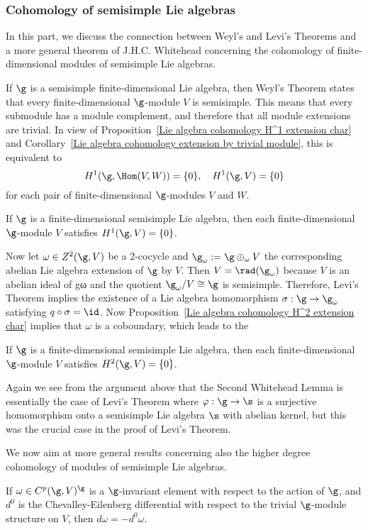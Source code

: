 \subsubsection{Cohomology of semisimple Lie algebras}
In this part, we discuss the connection between Weyl's and Levi's Theorems and a more general theorem of J.H.C. Whitehead concerning the cohomology of finite-dimensional modules of semisimple Lie algebras.\par
If $\g$ is a semisimple finite-dimensional Lie algebra, then Weyl's Theorem states that every finite-dimensional $\g$-module $V$ is semisimple. This means that every submodule has a module complement, and therefore that all module extensions are trivial. In view of Proposition~\ref{Lie algebra cohomology H^1 extension char} and Corollary~\ref{Lie algebra cohomology extension by trivial module}, this is equivalent to
\[H^1(\g,\Hom(V,W))=\{0\},\quad H^1(\g,V)=\{0\}\]
for each pair of finite-dimensional $\g$-modules $V$ and $W$.
\begin{lemma}
If $\g$ is a finite-dimensional semisimple Lie algebra, then each finite-dimensional $\g$-module $V$ satisfies $H^1(\g,V)=\{0\}$.
\end{lemma}
Now let $\omega\in Z^2(\g,V)$ be a $2$-cocycle and $\g_\omega:=\g\oplus_\omega V$ the corresponding abelian Lie algebra extension of $\g$ by $V$. Then $V=\rad(\g_\omega)$ because $V$ is an abelian ideal of gω and the quotient $\g_\omega/V\cong\g$ is semisimple. Therefore, Levi's Theorem implies the existence of a Lie algebra homomorphism $\sigma:\g\to\g_\omega$ satisfying $q\circ\sigma=\id$. Now Proposition~\ref{Lie algebra cohomology H^2 extension char} implies that $\omega$ is a coboundary, which leads to the
\begin{lemma}
If $\g$ is a finite-dimensional semisimple Lie algebra, then each finite-dimensional $\g$-module $V$ satisfies $H^2(\g,V)=\{0\}$.
\end{lemma}
Again we see from the argument above that the Second Whitehead Lemma is essentially the case of Levi's Theorem where $\varphi:\g\to\s$ is a surjective homomorphism onto a semisimple Lie algebra $\s$ with abelian kernel, but this was the crucial case in the proof of Levi's Theorem.\par
We now aim at more general results concerning also the higher degree cohomology of modules of semisimple Lie algebras.
\begin{lemma}\label{Lie algebra semisimple differential on trivial module}
If $\omega\in C^p(\g,V)^{\g}$ is a $\g$-invariant element with respect to the action of $\g$, and $d^0$ is the Chevalley-Eilenberg differential with respect to the trivial $\g$-module structure on $V$, then $d\omega=-d^0\omega$.
\end{lemma}
